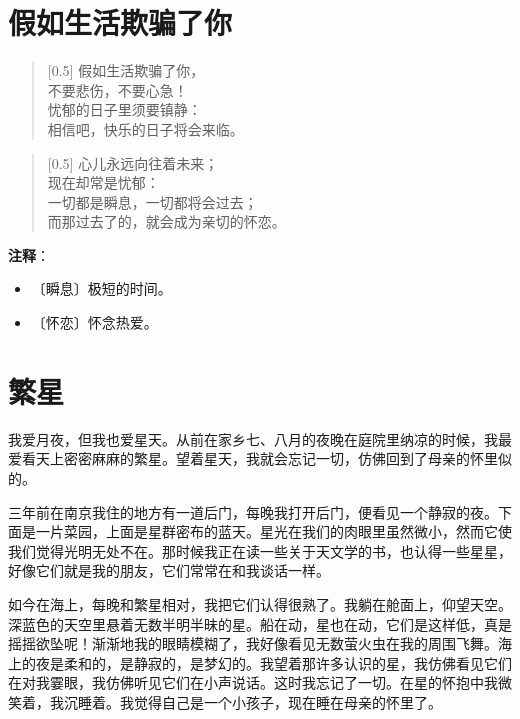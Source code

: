 \documentclass[12pt,UTF-8,openany]{ctexbook}
\begin{document}
\chapter{假如生活欺骗了你}

\begin{large}
    
    \begin{verse}[0.5\linewidth]
        假如生活欺骗了你， \\
        不要悲伤，不要心急！ \\
        忧郁的日子里须要镇静： \\
        相信吧，快乐的日子将会来临。
    \end{verse}
    
    
    \begin{verse}[0.5\linewidth]
        心儿永远向往着未来； \\
        现在却常是忧郁： \\
        一切都是瞬息，一切都将会过去； \\
        而那过去了的，就会成为亲切的怀恋。
    \end{verse}
    
\end{large}


\newpage

\textbf{注释}：

\vspace{-1em}

\begin{itemize}
    \setlength\itemsep{-0.2em}
    \item 〔瞬息〕极短的时间。
    \item 〔怀恋〕怀念热爱。
\end{itemize}

\chapter{繁星}

\begin{large}
    
    我爱月夜，但我也爱星天。从前在家乡七、八月的夜晚在庭院里纳凉的时候，我最爱看天上密密麻麻的繁星。望着星天，我就会忘记一切，仿佛回到了母亲的怀里似的。
    
    三年前在南京我住的地方有一道后门，每晚我打开后门，便看见一个静寂的夜。下面是一片菜园，上面是星群密布的蓝天。星光在我们的肉眼里虽然微小，然而它使我们觉得光明无处不在。那时候我正在读一些关于天文学的书，也认得一些星星，好像它们就是我的朋友，它们常常在和我谈话一样。
    
    如今在海上，每晚和繁星相对，我把它们认得很熟了。我躺在舱面上，仰望天空。深蓝色的天空里悬着无数半明半昧的星。船在动，星也在动，它们是这样低，真是摇摇欲坠呢！渐渐地我的眼睛模糊了，我好像看见无数萤火虫在我的周围飞舞。海上的夜是柔和的，是静寂的，是梦幻的。我望着那许多认识的星，我仿佛看见它们在对我霎眼，我仿佛听见它们在小声说话。这时我忘记了一切。在星的怀抱中我微笑着，我沉睡着。我觉得自己是一个小孩子，现在睡在母亲的怀里了。
    
\end{large}
\end{document}
